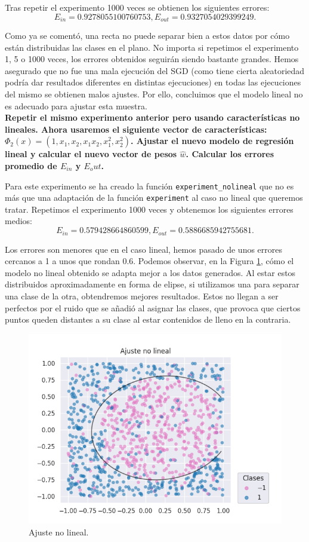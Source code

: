 \documentclass[a4paper, 20pt]{article}
\begin{document}
Tras repetir el experimento 1000 veces se obtienen los siguientes errores:\[
E_{in} = 0.9278055100760753,
E_{out} = 0.9327054029399249.\]

Como ya se comentó, una recta no puede separar bien a estos datos por cómo están distribuidas las clases en el plano. No importa si repetimos el experimento 1, 5 o 1000 veces, los errores obtenidos seguirán siendo bastante grandes. Hemos asegurado que no fue una mala ejecución del SGD (como tiene cierta aleatoriedad podría dar resultados diferentes en distintas ejecuciones) en todas las ejecuciones del mismo se obtienen malos ajustes. Por ello, concluimos que el modelo lineal no es adecuado para ajustar esta muestra.\\

\textbf{Repetir el mismo experimento anterior pero usando características no lineales. Ahora usaremos el siguiente vector de características: $\Phi_2 (x) = (1, x_1 , x_2 , x_1 x_2 , x^2_1, x^ 2_2)$. Ajustar el nuevo modelo de regresión lineal y calcular el nuevo vector de pesos $\hat{w}$. Calcular los errores promedio de $E_{in}$ y $E_out$.}

Para este experimento se ha creado la función \texttt{experiment\_nolineal} que no es más que una adaptación de la función \texttt{experiment} al caso no lineal que queremos tratar. Repetimos el experimento 1000 veces y obtenemos los siguientes errores medios:\[
E_{in} = 0.579428664860599, E_{out} = 0.5886685942755681.
\]

Los errores son menores que en el caso lineal, hemos pasado de unos errores cercanos a 1 a unos que rondan 0.6. Podemos observar, en la Figura \ref{fig:nolineal}, cómo el modelo no lineal obtenido se adapta mejor a los datos generados. Al estar estos distribuidos aproximadamente en forma de elipse, si utilizamos una para separar una clase de la otra, obtendremos mejores resultados. Estos no llegan a ser perfectos por el ruido que se añadió al asignar las clases, que provoca que ciertos puntos queden distantes a su clase al estar contenidos de lleno en la contraria. 

\begin{figure}[H]
    \centering
    \includegraphics[width=1\textwidth]{nolineal}
    \caption{Ajuste no lineal.}
    \label{fig:nolineal}
\end{figure}
\end{document}
